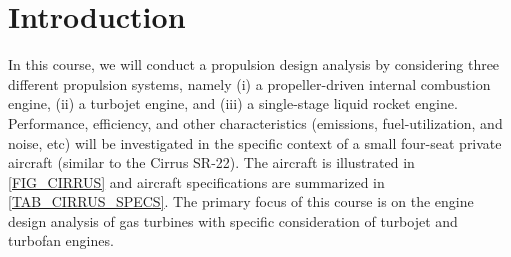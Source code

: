 \section{Introduction}
In this course, we will conduct a propulsion design analysis by considering three different propulsion systems, namely (i) a propeller-driven internal combustion engine, (ii) a turbojet engine, and (iii) a single-stage liquid rocket engine. Performance, efficiency, and other characteristics (emissions, fuel-utilization, and noise, etc) will be investigated in the specific context of a small four-seat private aircraft (similar to the Cirrus SR-22). The aircraft is illustrated in \cref{FIG_CIRRUS} and aircraft specifications are summarized in \cref{TAB_CIRRUS_SPECS}. The primary focus of this course is on the engine design analysis of gas turbines with specific consideration of  turbojet and turbofan engines. 

\begin{figure}[!tbh!]
  \begin{floatrow}
  \end{floatrow}
\end{figure}

